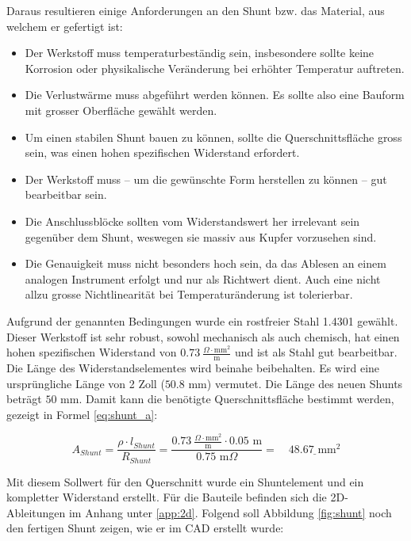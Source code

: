 Daraus resultieren einige Anforderungen an den Shunt bzw. das Material, aus welchem er gefertigt ist: \begin{itemize}
	\item Der Werkstoff muss temperaturbeständig sein, insbesondere sollte keine Korrosion oder physikalische Veränderung bei erhöhter Temperatur auftreten.
	\item Die Verlustwärme muss abgeführt werden können. Es sollte also eine Bauform mit grosser Oberfläche gewählt werden.
	\item Um einen stabilen Shunt bauen zu können, sollte die Querschnittsfläche gross sein, was einen hohen spezifischen Widerstand erfordert.
	\item Der Werkstoff muss -- um die gewünschte Form herstellen zu können -- gut bearbeitbar sein.
	\item Die Anschlussblöcke sollten vom Widerstandswert her irrelevant sein gegenüber dem Shunt, weswegen sie massiv aus Kupfer vorzusehen sind.
	\item Die Genauigkeit muss nicht besonders hoch sein, da das Ablesen an einem analogen Instrument erfolgt und nur als Richtwert dient. Auch eine nicht allzu grosse Nichtlinearität bei Temperaturänderung ist tolerierbar.
\end{itemize}

Aufgrund der genannten Bedingungen wurde ein rostfreier Stahl 1.4301 \cite{4301} gewählt. Dieser Werkstoff ist sehr robust, sowohl mechanisch als auch chemisch, hat einen hohen spezifischen Widerstand von $0.73\ \frac{\Omega \cdot \text{mm}^2}{\text{m}}$ und ist als Stahl gut bearbeitbar. Die Länge des Widerstandselementes wird beinahe beibehalten. Es wird eine ursprüngliche Länge von 2 Zoll ($50.8$ mm) vermutet. Die Länge des neuen Shunts beträgt $50$ mm. Damit kann die benötigte Querschnittsfläche bestimmt werden, gezeigt in Formel \ref{eq:shunt_a}:

\begin{equation}
	A_{Shunt}=\frac{\rho\cdot l_{Shunt}}{R_{Shunt}}=\frac{0.73\ \frac{\Omega\cdot\text{mm}^2}{\text{m}}\cdot 0.05\text{ m}}{0.75\text{ m}\Omega}=\quad\underline{48.67\text{ mm}^2}
\label{eq:shunt_a}
\end{equation}

Mit diesem Sollwert für den Querschnitt wurde ein Shuntelement und ein kompletter Widerstand erstellt. Für die Bauteile befinden sich die 2D-Ableitungen im Anhang unter \ref{app:2d}. Folgend soll Abbildung \ref{fig:shunt} noch den fertigen Shunt zeigen, wie er im CAD erstellt wurde:

